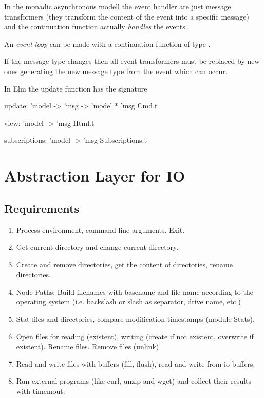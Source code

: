 In the monadic asynchronous modell the event handler are just message
transformers (they transform the content of the event into a specific message)
and the continuation function actually \emph{handles} the events.

An \emph{event loop} can be made with a continuation function of type .

If the message type changes then all event transformers must be replaced by
new ones generating the new message type from the event which can occur.

In Elm the update function has the signature
\begin{ocaml}
  update: 'model -> 'msg -> 'model * 'msg Cmd.t

  view: 'model -> 'msg Html.t

  subscriptions: 'model -> 'msg Subscriptions.t
\end{ocaml}




\section{Abstraction Layer for IO}

\subsection{Requirements}

\begin{enumerate}

\item Process environment, command line arguments. Exit.

\item Get current directory and change current directory.

\item Create and remove directories, get the content of directories, rename
  directories.

\item Node Paths: Build filenames with basename and file name according to the
  operating system (i.e. backslash or slash as separator, drive name, etc.)

\item Stat files and directories, compare modification timestamps (module
  Stats).

\item Open files for reading (existent), writing (create if not existent,
  overwrite if existent). Rename files. Remove files (unlink)

\item Read and write files with buffers (fill, flush), read and write from io
  buffers.

\item Run external programs (like curl, unzip and wget) and collect their
  results with timemout.
\end{enumerate}


